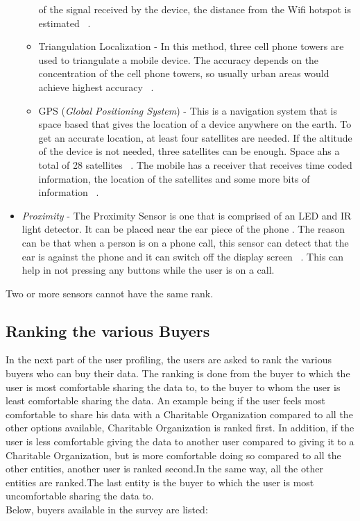 \begin{itemize}
\begin{itemize}
of the signal received by the device, the distance from the Wifi hotspot is estimated ~\cite{wifilocationintro}.
\item Triangulation Localization - In this method, three cell phone towers are used to triangulate a mobile device. The accuracy depends on the concentration of the cell phone towers, so usually urban areas would achieve highest accuracy ~\cite{triangulationintro}.
\item GPS ({\it Global Positioning System}) - This is a navigation system that is space based that gives the location of a device anywhere on the
earth. To get an accurate location, at least four satellites are needed. If the altitude of the device is not needed, three satellites can be enough.
Space ahs a total of 28 satellites ~\cite{gpsintro}. The mobile has a receiver that receives time coded information, the location of the satellites and some more bits of information ~\cite{gpsintro1}.
\end{itemize}
\item {\it Proximity} - The Proximity Sensor is one that is comprised of an LED and IR  light detector. It can be placed near the ear piece of the phone
. The reason can be that when a person is on a phone call, this sensor can detect that the ear is against the phone and it can switch off the
display screen ~\cite{lightintro}. This can help in not pressing any buttons while the user is on a call.
\end{itemize}

Two or more sensors cannot have the same rank.

\subsection{Ranking the various Buyers }

In the next part of the user profiling, the users are asked to rank the various buyers who can buy their data. The ranking is done from the buyer to which the user is most comfortable sharing the data to, to the buyer to whom the user is least comfortable sharing the data. An example being if the user feels most comfortable to share his data with a Charitable Organization compared to all the other options available, Charitable Organization is
ranked first. In addition, if the user is less comfortable giving the data to another user compared to giving it to a Charitable Organization, but is more comfortable doing so compared to all the other entities, another user is ranked second.In the same way, all the other entities are ranked.The last entity is the buyer to which the user is most uncomfortable sharing the data to. \\
Below, buyers available in the survey are listed:


